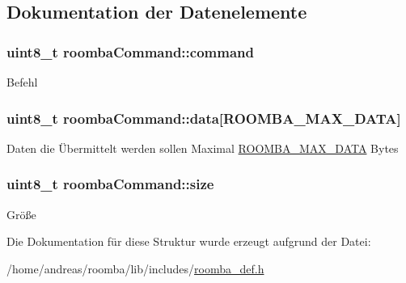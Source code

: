\subsection{Dokumentation der Datenelemente}
\hypertarget{structroombaCommand_a929e434c58990186eb87063e86e25e77}{
\subsubsection[{command}]{\setlength{\rightskip}{0pt plus 5cm}uint8\-\_\-t roomba\-Command\-::command}}\label{structroombaCommand_a929e434c58990186eb87063e86e25e77}
Befehl \hypertarget{structroombaCommand_a8a3e5f08a59058c05d169663f02437d0}{
\subsubsection[{data}]{\setlength{\rightskip}{0pt plus 5cm}uint8\-\_\-t roomba\-Command\-::data\mbox{[}{\bf R\-O\-O\-M\-B\-A\-\_\-\-M\-A\-X\-\_\-\-D\-A\-T\-A}\mbox{]}}}\label{structroombaCommand_a8a3e5f08a59058c05d169663f02437d0}
Daten die Übermittelt werden sollen Maximal \hyperlink{group__roomba__def_ga53c32c129fde6d7594f43690d6d81d97}{R\-O\-O\-M\-B\-A\-\_\-\-M\-A\-X\-\_\-\-D\-A\-T\-A} Bytes \hypertarget{structroombaCommand_a91ec3c8d801577abb2ad793a2f3db407}{
\subsubsection[{size}]{\setlength{\rightskip}{0pt plus 5cm}uint8\-\_\-t roomba\-Command\-::size}}\label{structroombaCommand_a91ec3c8d801577abb2ad793a2f3db407}
Größe 

Die Dokumentation für diese Struktur wurde erzeugt aufgrund der Datei\-:\begin{DoxyCompactItemize}
\item 
/home/andreas/roomba/lib/includes/\hyperlink{roomba__def_8h}{roomba\-\_\-def.\-h}\end{DoxyCompactItemize}
